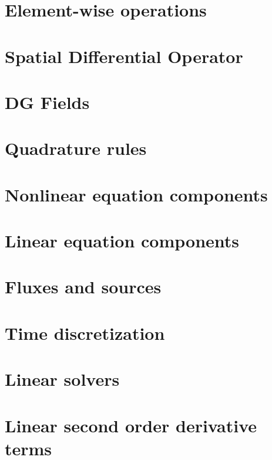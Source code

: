 \documentclass[11pt,twoside,a4paper]{fdyarticle}
\begin{document}
\newpage
\section{Element-wise operations}
\label{sec:Element-wise operations}


\newpage
\section{Spatial Differential Operator}
\label{sec:SpatialDifferentialOperator}


\newpage
\section{DG Fields}
\label{sec:DGFields}


\newpage
\section{Quadrature rules}
\label{sec:QuadRules}


\newpage
\section{Nonlinear equation components}
\label{sec:NECQuadrature}


\newpage
\section{Linear equation components}
\label{sec:LECQuadrature}


\newpage
\section{Fluxes and sources}
\label{sec:FluxAndSource}


\newpage
\section{Time discretization}
\label{sec:Timediscretization}


\newpage
\section{Linear solvers}
\label{sec:LinSolvers}


\newpage
\section{Linear second order derivative terms}
\label{sec:Linear2ndDerivativeTerms}



\newpage
{}

\end{document}
